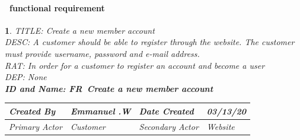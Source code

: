 \documentclass{scrreprt}
\theoremstyle{funreq}
\newtheorem{funreq}{}
\begin{document}
\paragraph[]{\Subsectionname ~functional requirement }
\begin{funreq}
	
	\label{account_create}
	TITLE: Create a new member account\\
	DESC: A customer should be able to register through the website. The customer must provide username, password and e-mail address. \\
	RAT: In order for a customer to register an account and become a user\\
	DEP: None\\
	
	\bfseries{ID and Name: FR\thefunreq ~\hspace{.6cm}Create a new member account}
	\begin{table}[H]
		\begin{tabularx}{\columnwidth}{|X|X|X|X|}
			\hline
			Created By    & Emmanuel .W & Date Created    & 03/13/20 \\ \hline
			Primary Actor & Customer        & Secondary Actor & Website \\ \hline
		\end{tabularx}
		

\end{table}
\end{funreq}
\end{document}
